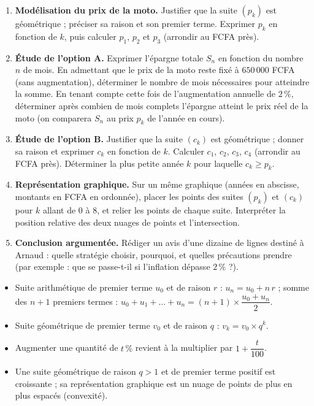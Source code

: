 \documentclass[11pt]{article}
\newcommand{\cle}[1]{{\popxbold\color{popdark}#1}}
\newcounter{popsec}
\newcounter{popsub}
\newcommand{\courssub}[1]{%
  \stepcounter{popsub}%
  \par\vspace{9pt}\noindent{\popxbold\fontsize{11.5}{13}\selectfont\color{popink}{\color{poporange}\thepopsec.\thepopsub}\hspace{6pt}#1}\par\nopagebreak\vspace{4pt}
}
\begin{document}
\begin{enumerate}
\item \textbf{Modélisation du prix de la moto.} Justifier que la suite $(p_k)$ est géométrique ; préciser sa raison et son premier terme. Exprimer $p_k$ en fonction de $k$, puis calculer $p_1$, $p_2$ et $p_3$ (arrondir au FCFA près).
\item \textbf{Étude de l'option A.} Exprimer l'épargne totale $S_n$ en fonction du nombre $n$ de mois. En admettant que le prix de la moto reste fixé à $650\,000$ FCFA (sans augmentation), déterminer le nombre de mois nécessaires pour atteindre la somme. En tenant compte cette fois de l'augmentation annuelle de $2\,\%$, déterminer après combien de mois complets l'épargne atteint le prix réel de la moto (on comparera $S_n$ au prix $p_k$ de l'année en cours).
\item \textbf{Étude de l'option B.} Justifier que la suite $(c_k)$ est géométrique ; donner sa raison et exprimer $c_k$ en fonction de $k$. Calculer $c_1$, $c_2$, $c_3$, $c_4$ (arrondir au FCFA près). Déterminer la plus petite année $k$ pour laquelle $c_k \geq p_k$.
\item \textbf{Représentation graphique.} Sur un même graphique (années en abscisse, montants en FCFA en ordonnée), placer les points des suites $(p_k)$ et $(c_k)$ pour $k$ allant de $0$ à $8$, et relier les points de chaque suite. Interpréter la position relative des deux nuages de points et l'intersection.
\item \textbf{Conclusion argumentée.} Rédiger un avis d'une dizaine de lignes destiné à Arnaud : quelle stratégie choisir, pourquoi, et quelles précautions prendre (par exemple : que se passe-t-il si l'inflation dépasse $2\,\%$ ?).
\end{enumerate}

\courssub{Ressources à mobiliser}

\begin{aretenir}
\begin{itemize}
\item \cle{Suite arithmétique} de premier terme $u_0$ et de raison $r$ : $u_n = u_0 + n\,r$ ; somme des $n+1$ premiers termes : $u_0 + u_1 + \dots + u_n = (n+1)\times \dfrac{u_0 + u_n}{2}$.
\item \cle{Suite géométrique} de premier terme $v_0$ et de raison $q$ : $v_k = v_0 \times q^k$.
\item Augmenter une quantité de $t\,\%$ revient à la multiplier par $1 + \dfrac{t}{100}$.
\item Une suite géométrique de raison $q > 1$ et de premier terme positif est \cle{croissante} ; sa représentation graphique est un nuage de points de plus en plus espacés (convexité).
\end{itemize}
\end{aretenir}
\end{document}
